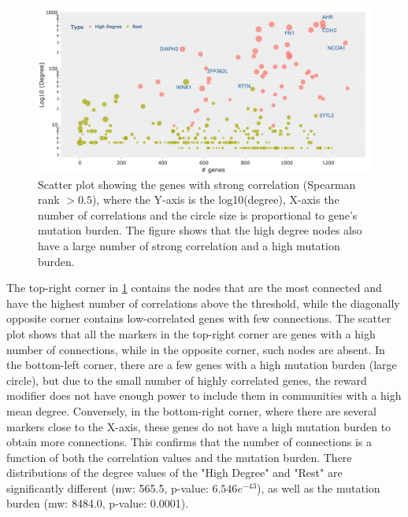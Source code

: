 \begin{figure}[!b]    
    \centering
    \includegraphics[width=1.0\textwidth,height=1.0\textheight,keepaspectratio]{Sections/Network_II/resources/reward/Degree_highCorrGenes_labeled.png}
    \caption[Number of connections vs their strength]{Scatter plot showing the genes with strong correlation (Spearman rank $>0.5$), where the Y-axis is the log10(degree), X-axis the number of correlations and the circle size is proportional to gene's mutation burden. The figure shows that the high degree nodes also have a large number of strong correlation and a high mutation burden. }
    \label{fig:N_II:degree_high_corr}
\end{figure}


The top-right corner in \cref{fig:N_II:degree_high_corr} contains the nodes that are the most connected and have the highest number of correlations above the threshold, while the diagonally opposite corner contains low-correlated genes with few connections. The scatter plot shows that all the markers in the top-right corner are genes with a high number of connections, while in the opposite corner, such nodes are absent. In the bottom-left corner, there are a few genes with a high mutation burden (large circle), but due to the small number of highly correlated genes, the reward modifier does not have enough power to include them in communities with a high mean degree. Conversely, in the bottom-right corner, where there are several markers close to the X-axis, these genes do not have a high mutation burden to obtain more connections. This confirms that the number of connections is a function of both the correlation values and the mutation burden. There distributions of the degree values of the "High Degree" and "Rest" are significantly different (\acrshort{mw}: 565.5, p-value: $6.546e^{-43}$), as well as the mutation burden (\acrshort{mw}: 8484.0, p-value: 0.0001).

